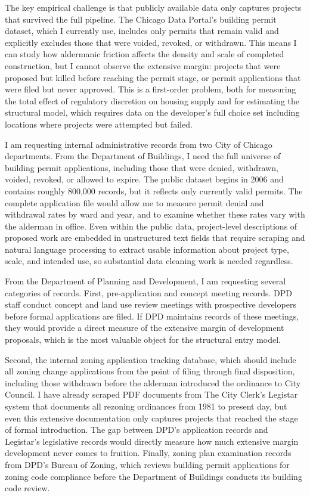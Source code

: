 \documentclass[12pt]{article}
\begin{document}
The key empirical challenge is that publicly available data only captures projects that survived the full pipeline. The Chicago Data Portal's building permit dataset, which I currently use, includes only permits that remain valid and explicitly excludes those that were voided, revoked, or withdrawn. This means I can study how aldermanic friction affects the density and scale of completed construction, but I cannot observe the extensive margin: projects that were proposed but killed before reaching the permit stage, or permit applications that were filed but never approved. This is a first-order problem, both for measuring the total effect of regulatory discretion on housing supply and for estimating the structural model, which requires data on the developer's full choice set including locations where projects were attempted but failed.

I am requesting internal administrative records from two City of Chicago departments. From the Department of Buildings, I need the full universe of building permit applications, including those that were denied, withdrawn, voided, revoked, or allowed to expire. The public dataset begins in 2006 and contains roughly 800,000 records, but it reflects only currently valid permits. The complete application file would allow me to measure permit denial and withdrawal rates by ward and year, and to examine whether these rates vary with the alderman in office. Even within the public data, project-level descriptions of proposed work are embedded in unstructured text fields that require scraping and natural language processing to extract usable information about project type, scale, and intended use, so substantial data cleaning work is needed regardless.

From the Department of Planning and Development, I am requesting several categories of records. First, pre-application and concept meeting records. DPD staff conduct concept and land use review meetings with prospective developers before formal applications are filed. If DPD maintains records of these meetings, they would provide a direct measure of the extensive margin of development proposals, which is the most valuable object for the structural entry model. 

Second, the internal zoning application tracking database, which should include all zoning change applications from the point of filing through final disposition, including those withdrawn before the alderman introduced the ordinance to City Council. I have already scraped PDF documents from The City Clerk's Legistar system that documents all rezoning ordinances from 1981 to present day, but even this extensive documentation only captures projects that reached the stage of formal introduction. The gap between DPD's application records and Legistar's legislative records would directly measure how much extensive margin development never comes to fruition. Finally, zoning plan examination records from DPD's Bureau of Zoning, which reviews building permit applications for zoning code compliance before the Department of Buildings conducts its building code review.
\end{document}
